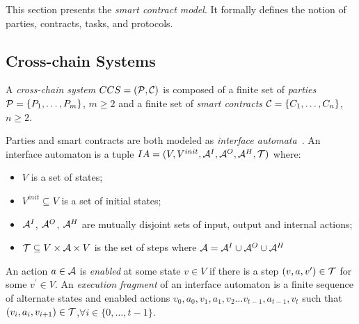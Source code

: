 This section presents
the \emph{smart contract model}.
It formally defines the notion of parties, contracts, tasks, and protocols.

\subsection{Cross-chain Systems}
 A \emph{cross-chain system} $CCS=({\mathcal P},{\mathcal C})$ is composed of a finite set of \emph{parties} ${\mathcal P}=\{P_1, \ldots, P_m\}$, $m \geq 2$ and a finite set of \emph{smart contracts} ${\mathcal C}=\{C_1, \ldots, C_n\}$, $n \geq 2$. 
 
Parties and smart contracts are both modeled as \emph{interface automata}~\cite{AlfaroH01}.
 An interface automaton is a tuple $IA=(V, V^{init}, {\mathcal A}^I, {\mathcal A}^O, {\mathcal A}^H, {\mathcal T})$  where:
 \begin{itemize}
     \item $V$ is a set of states;
     \item $V^{init} \subseteq V$ is a set of initial states;
     \item ${\mathcal A}^I$, ${\mathcal A}^O$, ${\mathcal A}^H$ are mutually disjoint sets of input, output and internal actions;
     \item ${\mathcal T} \subseteq V \times {\mathcal A} \times V$ is the set of steps where ${\mathcal A}={\mathcal A}^I \cup {\mathcal A}^O \cup {\mathcal A}^H$   
 \end{itemize}
An action $a \in {\mathcal A}$ is \emph{enabled} at some state $v \in V$ if there is a step $(v,a,v^\prime) \in {\mathcal T}$ for some $v^\prime \in V$.
An \emph{execution fragment}  of an interface automaton is a finite sequence of alternate states and enabled actions $v_0,a_0,v_1,a_1,v_2 \ldots v_{t-1},a_{t-1},v_t$ such that $(v_i,a_i,v_{i+1}) \in {\mathcal T}$,$  \forall i \in \{0, \dots, t-1\}$.

